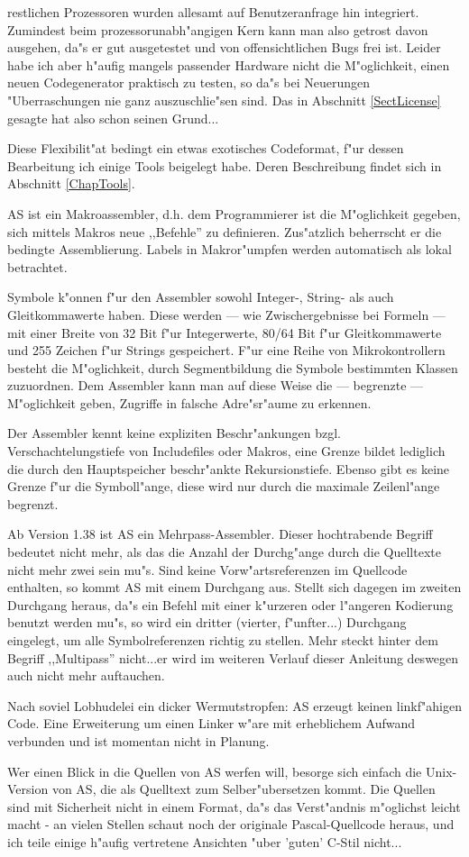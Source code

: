 \documentclass[12pt,a4paper,twoside]{report}
\begin{document}
restlichen Prozessoren wurden allesamt auf Benutzeranfrage hin integriert.
Zumindest beim prozessorunabh"angigen Kern kann man also getrost davon
ausgehen, da"s er gut ausgetestet und von offensichtlichen Bugs frei ist.
Leider habe ich aber h"aufig mangels passender Hardware nicht die
M"oglichkeit, einen neuen Codegenerator praktisch zu testen, so da"s bei
Neuerungen "Uberraschungen nie ganz auszuschlie"sen sind.  Das in
Abschnitt \ref{SectLicense} gesagte hat also schon seinen Grund...
\par
Diese Flexibilit"at bedingt ein etwas exotisches Codeformat, f"ur dessen
Bearbeitung ich einige Tools beigelegt habe.  Deren Beschreibung findet
sich in Abschnitt \ref{ChapTools}.
\par
AS ist ein Makroassembler, d.h. dem Programmierer ist die M"oglichkeit
gegeben, sich mittels Makros neue ,,Befehle'' zu definieren.  Zus"atzlich
beherrscht er die bedingte Assemblierung.  Labels in Makror"umpfen werden
automatisch als lokal betrachtet.
\par
Symbole k"onnen f"ur den Assembler sowohl Integer-, String- als auch
Gleitkommawerte haben.  Diese werden --- wie Zwischergebnisse bei Formeln
--- mit einer Breite von 32 Bit f"ur Integerwerte, 80/64 Bit f"ur
Gleitkommawerte und 255 Zeichen f"ur Strings gespeichert.  F"ur eine Reihe
von Mikrokontrollern besteht die M"oglichkeit, durch Segmentbildung die
Symbole bestimmten Klassen zuzuordnen.  Dem Assembler kann man auf diese
Weise die --- begrenzte --- M"oglichkeit geben, Zugriffe in falsche
Adre"sr"aume zu erkennen.
\par
Der Assembler kennt keine expliziten Beschr"ankungen bzgl.
Verschachtelungstiefe von Includefiles oder Makros, eine Grenze bildet
lediglich die durch den Hauptspeicher beschr"ankte Rekursionstiefe.
Ebenso gibt es keine Grenze f"ur die Symboll"ange, diese wird nur durch
die maximale Zeilenl"ange begrenzt.
\par
Ab Version 1.38 ist AS ein Mehrpass-Assembler.  Dieser hochtrabende Begriff
bedeutet nicht mehr, als das die Anzahl der Durchg"ange durch die Quelltexte
nicht mehr zwei sein mu"s.  Sind keine Vorw"artsreferenzen im Quellcode
enthalten, so kommt AS mit einem Durchgang aus.  Stellt sich dagegen im zweiten
Durchgang heraus, da"s ein Befehl mit einer k"urzeren oder l"angeren Kodierung
benutzt werden mu"s, so wird ein dritter (vierter, f"unfter...) Durchgang
eingelegt, um alle Symbolreferenzen richtig zu stellen.  Mehr steckt hinter dem
Begriff ,,Multipass'' nicht...er wird im weiteren Verlauf dieser Anleitung
deswegen auch nicht mehr auftauchen.
\par
Nach soviel Lobhudelei ein dicker Wermutstropfen: AS erzeugt keinen
linkf"ahigen Code.  Eine Erweiterung um einen Linker w"are mit erheblichem
Aufwand verbunden und ist momentan nicht in Planung.
\par
Wer einen Blick in die Quellen von AS werfen will, besorge sich einfach
die Unix-Version von AS, die als Quelltext zum Selber"ubersetzen kommt.
Die Quellen sind mit Sicherheit nicht in einem Format, da"s das
Verst"andnis m"oglichst leicht macht - an vielen Stellen schaut noch
der originale Pascal-Quellcode heraus, und ich teile einige h"aufig
vertretene Ansichten "uber 'guten' C-Stil nicht...
\end{document}

